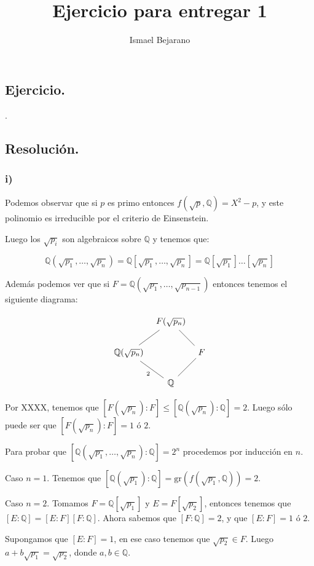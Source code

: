 \documentclass{article}
\title{Ejercicio para entregar 1}
\author{Ismael Bejarano}
\date{}
\def\Q{\mathbb{Q}}
\begin{document}
\maketitle

\subsection*{Ejercicio.}

.

\subsection*{Resolución.}

\subsubsection*{i)}

Podemos observar que si $p$ es primo entonces $f(\sqrt{p}, \Q) = X^2 - p$, y este polinomio es 
irreducible por el criterio de Einsenstein.

Luego los $\sqrt{p_i}$ son algebraicos sobre $\Q$ y tenemos que:

\[\Q(\sqrt{p_1},\dots,\sqrt{p_n}) = \Q[\sqrt{p_1},\dots,\sqrt{p_n}] = \Q[\sqrt{p_1}]\dots[\sqrt{p_n}] \]

Además podemos ver que si $F = \Q(\sqrt{p_1},\dots,\sqrt{p_{n-1}})$ 
entonces tenemos el siguiente diagrama:

\[
\begin{tikzcd}[column sep=tiny]
    & F(\sqrt{p_n}) \arrow[ld, dash] \arrow[rd, dash] & \\
\Q(\sqrt{p_n}) \arrow[rd, dash, "2"'] & & F \arrow[ld, dash] \\
& \Q & 
\end{tikzcd}
\]

Por XXXX, tenemos que $[F(\sqrt{p_n}):F] \le [\Q(\sqrt{p_n}):\Q] = 2$.
Luego sólo puede ser que $[F(\sqrt{p_n}):F] = 1$ ó $2$.

Para probar que $[\Q(\sqrt{p_1},\dots,\sqrt{p_n}):\Q] = 2^n$ procedemos 
por inducción en $n$.

Caso $n=1$. Tenemos que $[\Q(\sqrt{p_1}):\Q] = \textrm{gr}(f(\sqrt{p_1}, \Q)) = 2$.

Caso $n=2$. Tomamos $F = \Q[\sqrt{p_1}]$ y $E = F[\sqrt{p_2}]$, entonces
tenemos que $[E:\Q] = [E:F][F:\Q]$. Ahora sabemos que $[F:\Q] = 2$, y que 
$[E:F] = 1$ ó $2$.

Supongamos que $[E:F] = 1$, en ese caso tenemos que $\sqrt{p_2} \in F$.
Luego $a + b\sqrt{p_1} = \sqrt{p_2}$, donde $a,b \in \Q$.
\end{document}
